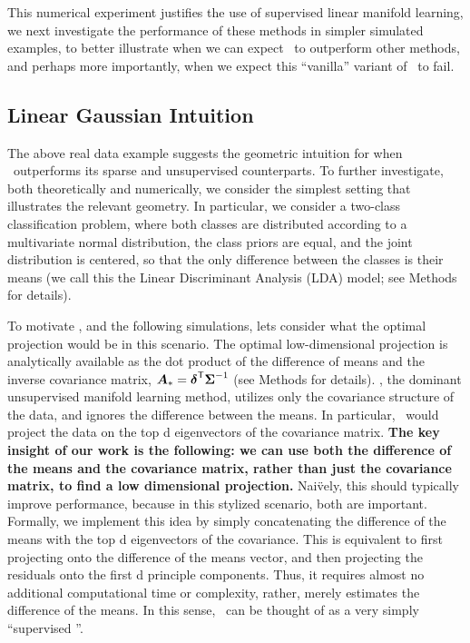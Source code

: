 \documentclass[10pt]{article}
\begin{document}
This numerical experiment justifies the use of supervised linear manifold learning, we next investigate the performance of these methods in simpler simulated examples, to better illustrate when we can expect \Lol~to outperform other methods, and perhaps more importantly, when we expect this ``vanilla'' variant of \Lol~to fail.

\subsection*{Linear Gaussian Intuition}

The above real data example suggests the geometric intuition for when \Lol~outperforms its sparse and unsupervised counterparts.  To further investigate, both theoretically and numerically, we consider the simplest setting that illustrates the relevant geometry.  In particular, we consider a two-class classification problem, where both classes are distributed according to a multivariate normal distribution, the class priors are equal, and the joint distribution is centered, so that the only difference between the classes is their means (we call this the Linear Discriminant Analysis (LDA) model; see Methods for details).  




To motivate \Lol, and the following simulations, lets consider what the optimal projection would be in this scenario. The optimal low-dimensional projection is analytically available as the dot product of the difference of means and the inverse covariance matrix, $\boldsymbol{A}_*=\boldsymbol{\delta}^{\mathsf{T}} \boldsymbol{\Sigma}^{-1}$ \cite{Bickel2004} (see Methods for details).  
\Pca, the dominant unsupervised manifold learning method, utilizes only the covariance structure of the data, and ignores the difference between the means.  
In particular, \Pca~would project the data on the top d eigenvectors of the  covariance matrix.
\textbf{The key insight of our work is the following: we can use both the difference of the means and the covariance matrix, rather than just the covariance matrix, to find a low dimensional projection.}  
Nai\"vely, this should typically improve performance, because in this stylized scenario, both are important.  Formally, we implement this idea by simply concatenating the difference of the means with the top d eigenvectors of the  covariance. 
This is equivalent to first projecting onto the difference of the means vector, and then projecting the residuals onto the first d principle components. 
Thus, it requires almost no additional computational time or complexity, rather, merely estimates the difference of the means.  
In this sense, \Lol~can be thought of as a very simply  ``supervised \Pca''.  
\end{document}
